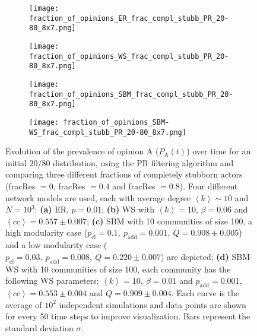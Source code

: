\documentclass[11 pt , letterpaper , twoside , openright]{book}
\begin{document}
\begin{figure}[H]
  \begin{subfigure}[b]{0.49\textwidth}
    \caption{}
  	\texttt{[image: fraction\_of\_opinions\_ER\_frac\_compl\_stubb\_PR\_20-80\_8x7.png]}
  \end{subfigure}
  \begin{subfigure}[b]{0.49\textwidth}
    \caption{}
  	\texttt{[image: fraction\_of\_opinions\_WS\_frac\_compl\_stubb\_PR\_20-80\_8x7.png]}
  \end{subfigure}
  \begin{subfigure}[b]{0.49\textwidth}
    \caption{}
    \texttt{[image: fraction\_of\_opinions\_SBM\_frac\_compl\_stubb\_PR\_20-80\_8x7.png]}
  \end{subfigure}
  \begin{subfigure}[b]{0.49\textwidth}
    \caption{}
    \texttt{[image: fraction\_of\_opinions\_SBM-WS\_frac\_compl\_stubb\_PR\_20-80\_8x7.png]}
  \end{subfigure}
  \captionsetup{format=plain}
  \caption[Evolution of the prevalence of opinion A ($P_\text{A}(t)$) over time for an initial $20/80$ opinion distribution, using the PR filtering algorithm and comparing three different fractions of completely stubborn actors (fracRes $= 0$, fracRes $= 0.4$ and fracRes $= 0.8$).]{Evolution of the prevalence of opinion A ($P_\text{A}(t)$) over time for an initial $20/80$ distribution, using the PR filtering algorithm and comparing three different fractions of completely stubborn actors (fracRes $= 0$, fracRes $= 0.4$ and fracRes $= 0.8$). Four different network models are used, each with average degree $\left<k\right> \sim 10$ and $N = 10^3$: \textbf{(a)} ER, $p=0.01$; \textbf{(b)} WS with $\left<k\right> = 10$, $\beta = 0.06$ and $\left<cc\right> = 0.557 \pm 0.007$; \textbf{(c)} SBM with 10 communities of size 100, a high modularity case ($p_{\text{cl}} = 0.1,\ p_{\text{add}} = 0.001,\ Q = 0.908 \pm 0.005$) and a low modularity case ($p_{\text{cl}} = 0.03,\ p_{\text{add}} = 0.008,\ Q = 0.220 \pm 0.007$) are depicted; \textbf{(d)} SBM-WS with 10 communities of size 100, each community has the following WS parameters: $\left<k\right> = 10,\ \beta = 0.01$ and $p_{\text{add}} = 0.001$, $\left<cc\right> = 0.553 \pm 0.004$ and $Q = 0.909 \pm 0.004$. Each curve is the average of $10^2$ independent simulations and data points are shown for every 50 time steps to improve visualization. Bars represent the standard deviation $\sigma$.}%
\label{ev_op_20_80_stubb_PR}
\end{figure}
\end{document}
